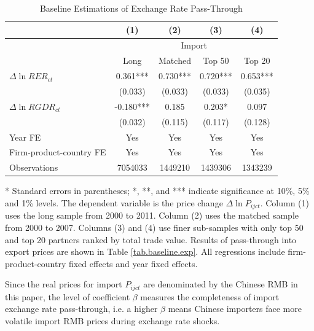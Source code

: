 \documentclass[12pt]{article}
\begin{document}
\begin{table}[htbp]
	\centering
	\caption{Baseline Estimations of Exchange Rate Pass-Through}
	\begin{threeparttable}
		\begin{tabular}{lcccc}
			\toprule
			& (1)   & (2)   & (3)   & (4) \\
			\midrule
			& \multicolumn{4}{c}{Import} \\
			& Long & Matched & Top 50 & Top 20 \\
			\midrule
			$\Delta \ln RER_{ct}$ & 0.361*** & 0.730*** & 0.720*** & 0.653*** \\
			& (0.033) & (0.033) & (0.033) & (0.035) \\
			$\Delta \ln RGDR_{ct}$ & -0.180*** & 0.185 & 0.203* & 0.097 \\
			& (0.032) & (0.115) & (0.117) & (0.128) \\
			Year FE  & Yes   & Yes   & Yes   & Yes \\
			Firm-product-country FE & Yes   & Yes   & Yes   & Yes \\
			Observations & 7054033 & 1449210 & 1439306 & 1343239 \\
			\bottomrule
		\end{tabular}
		\begin{tablenotes}
			\footnotesize
			\item[*] Standard errors in parentheses; *, **, and *** indicate significance at 10\%, 5\% and 1\% levels. The dependent variable is the price change $\Delta \ln P_{ijct}$. Column (1) uses the long sample from 2000 to 2011. Column (2) uses the matched sample from 2000 to 2007. Columns (3) and (4) use finer sub-samples with only top 50 and top 20 partners ranked by total trade value. Results of pass-through into export prices are shown in Table \ref{tab.baseline.exp}. All regressions include firm-product-country fixed effects and year fixed effects. 
		\end{tablenotes}
	\end{threeparttable}
	\label{tab.baseline}
\end{table}

Since the real prices for import $P_{i j c t}$ are denominated by the Chinese RMB in this paper, the level of coefficient $\beta$ measures the completeness of import exchange rate pass-through, i.e. a higher $\beta$ means Chinese importers face more volatile import RMB prices during exchange rate shocks. 
\end{document}
